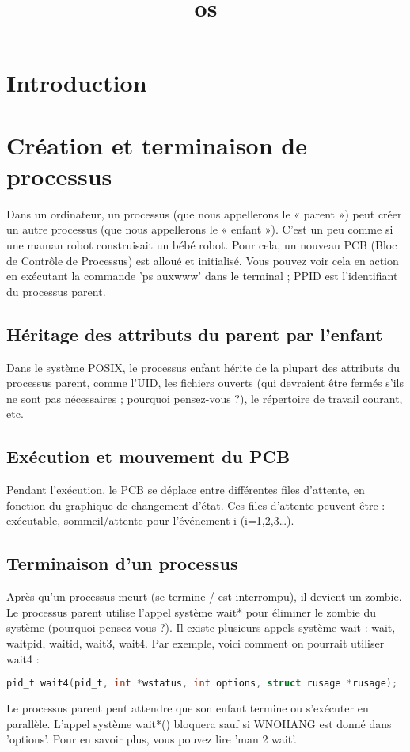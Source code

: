 \documentclass[12pt]{report}
\title{os}
\author{}
\begin{document}
\maketitle
\tableofcontents
\newpage

\section{Introduction}
\section{Création et terminaison de processus}Dans un ordinateur, un processus (que nous appellerons le « parent ») peut créer un autre processus (que nous appellerons le « enfant »). C'est un peu comme si une maman robot construisait un bébé robot. Pour cela, un nouveau PCB (Bloc de Contrôle de Processus) est alloué et initialisé. Vous pouvez voir cela en action en exécutant la commande 'ps auxwww' dans le terminal ; PPID est l'identifiant du processus parent.\subsection{Héritage des attributs du parent par l'enfant}Dans le système POSIX, le processus enfant hérite de la plupart des attributs du processus parent, comme l'UID, les fichiers ouverts (qui devraient être fermés s'ils ne sont pas nécessaires ; pourquoi pensez-vous ?), le répertoire de travail courant, etc.\subsection{Exécution et mouvement du PCB}Pendant l'exécution, le PCB se déplace entre différentes files d'attente, en fonction du graphique de changement d'état. Ces files d'attente peuvent être : exécutable, sommeil/attente pour l'événement i (i=1,2,3…).\subsection{Terminaison d'un processus}Après qu'un processus meurt (se termine / est interrompu), il devient un zombie. Le processus parent utilise l'appel système wait* pour éliminer le zombie du système (pourquoi pensez-vous ?). Il existe plusieurs appels système wait : wait, waitpid, waitid, wait3, wait4. Par exemple, voici comment on pourrait utiliser wait4 :\begin{lstlisting}[language=C]pid_t wait4(pid_t, int *wstatus, int options, struct rusage *rusage);\end{lstlisting}Le processus parent peut attendre que son enfant termine ou s'exécuter en parallèle. L'appel système wait*() bloquera sauf si WNOHANG est donné dans 'options'. Pour en savoir plus, vous pouvez lire 'man 2 wait'.
\end{document}
